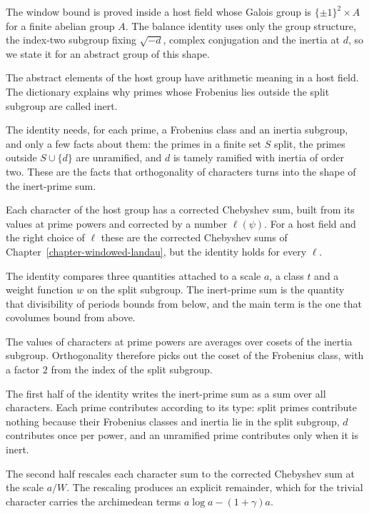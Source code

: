 The window bound is proved inside a host field whose Galois group is
$\{\pm1\}^2\times A$ for a finite abelian group $A$. The balance identity uses
only the group structure, the index-two subgroup fixing $\sqrt{-d}$, complex
conjugation and the inertia at $d$, so we state it for an abstract group of
this shape.

The abstract elements of the host group have arithmetic meaning in a host field.
The dictionary explains why primes whose Frobenius lies outside the split
subgroup are called inert.

The identity needs, for each prime, a Frobenius class and an inertia subgroup,
and only a few facts about them: the primes in a finite set $S$ split, the
primes outside $S\cup\{d\}$ are unramified, and $d$ is tamely ramified with
inertia of order two. These are the facts that orthogonality of characters
turns into the shape of the inert-prime sum.

Each character of the host group has a corrected Chebyshev sum, built from its values at
prime powers and corrected by a number $\ell(\psi)$. For a host field and the
right choice of $\ell$ these are the corrected Chebyshev sums of
Chapter~\ref{chapter-windowed-landau}, but the identity holds for every
$\ell$.

The identity compares three quantities attached to a scale $a$, a class $t$
and a weight function $w$ on the split subgroup. The inert-prime sum is the
quantity that divisibility of periods bounds from below, and the main term is
the one that covolumes bound from above.

The values of characters at prime powers are averages over cosets of the
inertia subgroup. Orthogonality therefore picks out the coset of the Frobenius
class, with a factor $2$ from the index of the split subgroup.

The first half of the identity writes the inert-prime sum as a sum over all
characters. Each prime contributes according to its type: split primes
contribute nothing because their Frobenius classes and inertia lie in the split
subgroup, $d$ contributes once per power, and an unramified prime contributes
only when it is inert.

The second half rescales each character sum to the corrected Chebyshev sum at the scale
$a/W$. The rescaling produces an explicit remainder, which for the trivial
character carries the archimedean terms $a\log a-(1+\gamma)a$.

